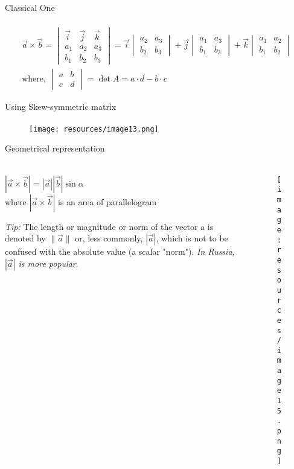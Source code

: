 \documentclass[aspectratio=169,notes]{beamer}
\begin{document}
\begin{frame}[t]{Classical One}
\framesubtitle{}
    \begin{align*}
        \vec{a} \times \vec{b} = \begin{vmatrix}
            \vec{i} & \vec{j} & \vec{k}\\ 
            a_{1} & a_{2} & a_{3}\\
            b_{1} & b_{2} & b_{3} 
       \end{vmatrix} = \vec{i}\begin{vmatrix} a_{2} & a_{3} \\ b_{2} & b_{3} \end{vmatrix} + 
       \vec{j}\begin{vmatrix} a_{1} & a_{3} \\ b_{1} & b_{3} \end{vmatrix} +
       \vec{k}\begin{vmatrix} a_{1} & a_{2} \\ b_{1} & b_{2} \end{vmatrix} \\
       \text{where, } \begin{vmatrix} a & b \\ c & d \end{vmatrix} = \det A = a \cdot d - b \cdot c
    \end{align*}
\end{frame}

\begin{frame}[t]{Using Skew-symmetric matrix}
\framesubtitle{}
    \vspace{-0.6cm}
    \begin{figure}[H]
        \centering\texttt{[image: resources/image13.png]}
        \label{fig:resources/image13.png}
    \end{figure}
\end{frame}

\begin{frame}[t]{Geometrical representation}
\framesubtitle{}
\begin{columns}[T,onlytextwidth]
    \begin{column}{0.59\textwidth}
        $|\vec{a} \times \vec{b}| = |\vec{a}| |\vec{b}| \sin \alpha$ \\ 
        where $|\vec{a} \times \vec{b}|$ is an area of parallelogram \bigskip

        \textit{Tip:} The length or magnitude or norm of the vector a is denoted by $\|\vec{a}\|$ or, less commonly, $|\vec{a}|$, which is not to be confused with the absolute value (a scalar "norm"). \textit{In Russia, $|\vec{a}|$ is more popular}.
    \end{column}
    \begin{column}{0.39\textwidth}
        \begin{figure}[H]
            \centering\texttt{[image: resources/image15.png]}
            \label{fig:resources/image15.png}
        \end{figure}
    \end{column}
\end{columns}
\end{frame}
\end{document}
